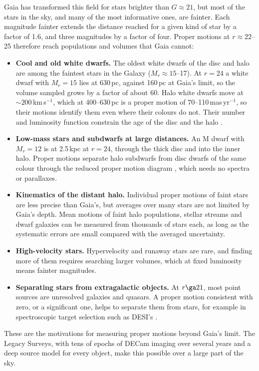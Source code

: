 \documentclass[usenatbib]{mnras}   %
\newcommand{\kms}{\,km\,s$^{-1}$} %
\begin{document}
\label{sec:intro_science}Gaia \citep{GaiaDR3} has transformed this field for stars brighter than $G \approx 21$, but most of the stars in the sky, and many of the most informative ones, are fainter. Each magnitude fainter extends the distance reached for a given kind of star by a factor of 1.6, and three magnitudes by a factor of four. Proper motions at $r \approx 22$--25 therefore reach populations and volumes that Gaia cannot:
\begin{itemize}
    \item \textbf{Cool and old white dwarfs.} The oldest white dwarfs of the disc and halo are among the faintest stars in the Galaxy ($M_r \approx 15$--17). At $r = 24$ a white dwarf with $M_r = 15$ lies at 630\,pc, against 160\,pc at Gaia's limit, so the volume sampled grows by a factor of about 60. Halo white dwarfs move at $\sim\!200$\kms, which at 400--630\,pc is a proper motion of 70--110\,mas\,yr$^{-1}$, so their motions identify them even where their colours do not. Their number and luminosity function constrain the age of the disc and the halo \citep{Harris2006, Kilic2006, Munn2017}.
    \item \textbf{Low-mass stars and subdwarfs at large distances.} An M dwarf with $M_r = 12$ is at 2.5\,kpc at $r = 24$, through the thick disc and into the inner halo. Proper motions separate halo subdwarfs from disc dwarfs of the same colour through the reduced proper motion diagram \citep{SalimGould2002, LepineShara2005, Smith2009}, which needs no spectra or parallaxes.
    \item \textbf{Kinematics of the distant halo.} Individual proper motions of faint stars are less precise than Gaia's, but averages over many stars are not limited by Gaia's depth. Mean motions of faint halo populations, stellar streams and dwarf galaxies can be measured from thousands of stars each, as long as the systematic errors are small compared with the averaged uncertainty.
    \item \textbf{High-velocity stars.} Hypervelocity and runaway stars \citep{Marchetti2021, Igoshev2022} are rare, and finding more of them requires searching larger volumes, which at fixed luminosity means fainter magnitudes.
    \item \textbf{Separating stars from extragalactic objects.} At $r \ga 21$, most point sources are unresolved galaxies and quasars. A proper motion consistent with zero, or a significant one, helps to separate them from stars, for example in spectroscopic target selection such as DESI's \citep{DESI2016}.
\end{itemize}
These are the motivations for measuring proper motions beyond Gaia's limit. The Legacy Surveys, with tens of epochs of DECam imaging over several years and a deep source model for every object, make this possible over a large part of the sky.
\end{document}
